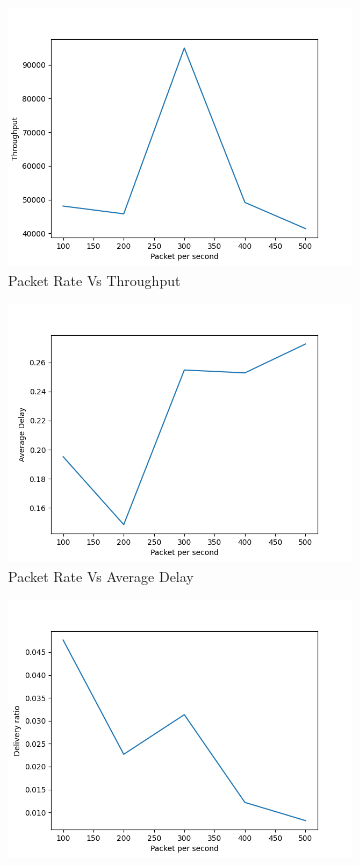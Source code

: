 \begin{figure}[h]
\begin{subfigure}{.5\textwidth}
  \centering
  \includegraphics[width=.8\linewidth]{_15_4_static/PacketpersecondvsThroughput.png}
     \caption{Packet Rate Vs Throughput}
    \label{packet_rate_throughput}
\end{subfigure}
\begin{subfigure}{.5\textwidth}
  \centering
  \includegraphics[width=.8\linewidth]{_15_4_static/PacketpersecondvsAverageDelay.png}
    \caption{Packet Rate Vs Average Delay}
     \label{packet_rate_delay}
\end{subfigure}
\begin{subfigure}{.5\textwidth}
  \centering
  \includegraphics[width=.8\linewidth]{_15_4_static/PacketpersecondvsDeliveryRatio.png}

\end{subfigure}
\end{figure}
